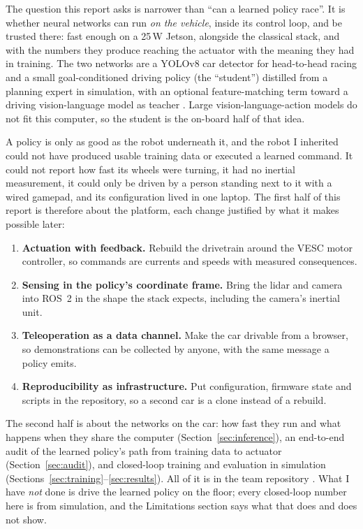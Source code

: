 \documentclass[12pt]{article}
\begin{document}
The question this report asks is narrower than ``can a learned policy race''. It is whether
neural networks can run \emph{on the vehicle}, inside its control loop, and be trusted there:
fast enough on a 25\,W Jetson, alongside the classical stack, and with the numbers they
produce reaching the actuator with the meaning they had in training. The two networks are a
YOLOv8 car detector for head-to-head racing and a small goal-conditioned driving policy (the
``student'') distilled from a planning expert in simulation, with an optional feature-matching
term toward a driving vision-language model as teacher \cite{qwenrobot}. Large
vision-language-action models \cite{openvla, pi0, groot} do not fit this computer, so the
student is the on-board half of that idea.

A policy is only as good as the robot underneath it, and the robot I inherited could not have
produced usable training data or executed a learned command. It could not report how fast its
wheels were turning, it had no inertial measurement, it could only be driven by a person
standing next to it with a wired gamepad, and its configuration lived in one laptop. The first
half of this report is therefore about the platform, each change justified by what it makes
possible later:

\begin{enumerate}
  \item \textbf{Actuation with feedback.} Rebuild the drivetrain around the VESC motor
        controller, so commands are currents and speeds with measured consequences.
  \item \textbf{Sensing in the policy's coordinate frame.} Bring the lidar and camera into
        ROS~2 in the shape the stack expects, including the camera's inertial unit.
  \item \textbf{Teleoperation as a data channel.} Make the car drivable from a browser, so
        demonstrations can be collected by anyone, with the same message a policy emits.
  \item \textbf{Reproducibility as infrastructure.} Put configuration, firmware state and
        scripts in the repository, so a second car is a clone instead of a rebuild.
\end{enumerate}

The second half is about the networks on the car: how fast they run and what happens when
they share the computer (Section~\ref{sec:inference}), an end-to-end audit of the learned
policy's path from training data to actuator (Section~\ref{sec:audit}), and closed-loop training
and evaluation in simulation (Sections~\ref{sec:training}--\ref{sec:results}). All of it is in
the team repository \cite{atlasrepo}. What I have \emph{not} done is drive the learned policy
on the floor; every closed-loop number here is from simulation, and the Limitations section
says what that does and does not show.
\end{document}
